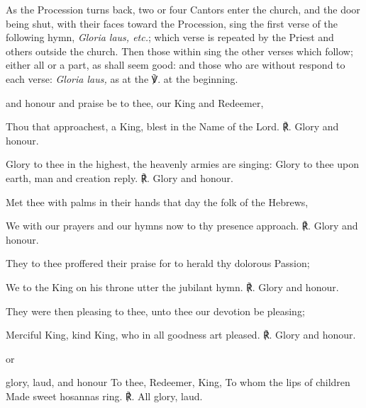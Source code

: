 \par
{}
\begin{rubric}
    As the Procession turns back, two or four Cantors enter the church, and the door being shut, with their faces toward the Procession, sing the first verse of the following hymn, \emph{Gloria laus, etc.}; which verse is repeated by the Priest and others outside the church. Then those within sing the other verses which follow; either all or a part, as shall seem good: and those who are without respond to each verse: \emph{Gloria laus,} as at the ℣. at the beginning.
\end{rubric}
 and honour and praise be to thee, our King and Redeemer,\par
{}
Thou that approachest, a King, blest in the Name of the Lord. ℟. Glory and honour.\par
Glory to thee in the highest, the heavenly armies are singing: Glory to thee upon earth, man and creation reply. ℟. Glory and honour.\par
Met thee with palms in their hands that day the folk of the Hebrews,\par
We with our prayers and our hymns now to thy presence approach. ℟. Glory and honour.\par
They to thee proffered their praise for to herald thy dolorous Passion;\par
We to the King on his throne utter the jubilant hymn. ℟. Glory and honour.\par
They were then pleasing to thee, unto thee our devotion be pleasing;\par
Merciful King, kind King, who in all goodness art pleased. ℟. Glory and honour.\par
\begin{inhead}
    or
\end{inhead}
 glory, laud, and honour To thee, Redeemer, King, To whom the lips of children Made sweet hosannas ring. ℟. All glory, laud.\par
{}
